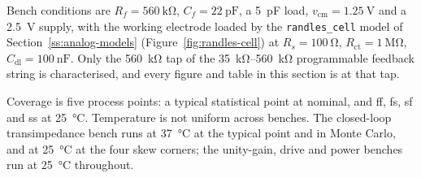 Bench conditions are $R_f = \SI{560}{\kilo\ohm}$, $C_f = \SI{22}{\pico\farad}$, a
\SI{5}{\pico\farad} load, $v_{\mathrm{cm}} = \SI{1.25}{\volt}$ and a \SI{2.5}{\volt}
supply, with the working electrode loaded by the \texttt{randles\_cell} model of
Section~\ref{ss:analog-models} (Figure~\ref{fig:randles-cell}) at
$R_s = \SI{100}{\ohm}$, $R_{\mathrm{ct}} = \SI{1}{\mega\ohm}$,
$C_{\mathrm{dl}} = \SI{100}{\nano\farad}$. Only the \SI{560}{\kilo\ohm} tap of the
\SIrange{35}{560}{\kilo\ohm} programmable feedback string is characterised, and every
figure and table in this section is at that tap.

Coverage is five process points: a typical statistical point at nominal, and
ff, fs, sf and ss at \SI{25}{\celsius}.
Temperature is not uniform across benches. The closed-loop transimpedance bench runs
at \SI{37}{\celsius} at the typical point and in Monte Carlo, and at
\SI{25}{\celsius} at the four skew corners; the unity-gain, drive and power benches
run at \SI{25}{\celsius} throughout.
